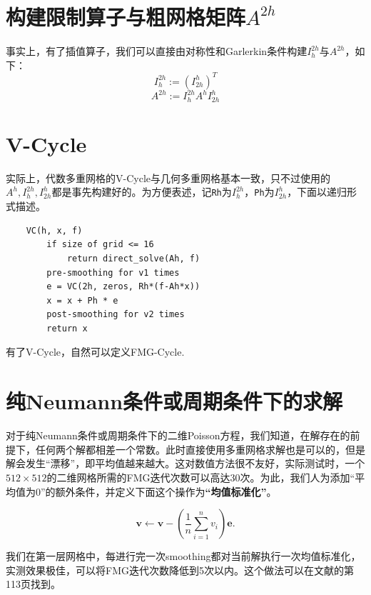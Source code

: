 \documentclass[lang=cn,10pt,bibend=bibtex]{elegantbook}
\begin{document}
\section{构建限制算子与粗网格矩阵$A^{2h}$}

事实上，有了插值算子，我们可以直接由对称性和Garlerkin条件构建$I_{h}^{2h}$与$A^{2h}$，如下：
\begin{equation}
  I_{h}^{2h}:=(I_{2h}^{h})^T
\end{equation}
\begin{equation}
  A^{2h}:=I_{h}^{2h}A^hI_{2h}^{h}
\end{equation}

\section{V-Cycle}

实际上，代数多重网格的V-Cycle与几何多重网格基本一致，只不过使用的$A^h,I_h^{2h},I_{2h}^h$都是事先构建好的。为方便表述，记\verb|Rh|为$I_{h}^{2h}$，\verb|Ph|为$I_{2h}^{h}$，下面以递归形式描述。

\begin{lstlisting}
    VC(h, x, f)
        if size of grid <= 16
            return direct_solve(Ah, f)
        pre-smoothing for v1 times
        e = VC(2h, zeros, Rh*(f-Ah*x))
        x = x + Ph * e
        post-smoothing for v2 times
        return x
\end{lstlisting}

有了V-Cycle，自然可以定义FMG-Cycle.

\section{纯Neumann条件或周期条件下的求解}

对于纯Neumann条件或周期条件下的二维Poisson方程，我们知道，在解存在的前提下，任何两个解都相差一个常数。此时直接使用多重网格求解也是可以的，但是解会发生“漂移”，即平均值越来越大。这对数值方法很不友好，实际测试时，一个$512\times 512$的二维网格所需的FMG迭代次数可以高达$30$次。为此，我们人为添加“平均值为$0$”的额外条件，并定义下面这个操作为\textbf{“均值标准化”}。

\begin{equation*}
  \mathbf{v}\gets \mathbf{v}-\left(\frac{1}{n}\sum_{i=1}^n v_i\right)\mathbf{e}.
\end{equation*}

我们在第一层网格中，每进行完一次smoothing都对当前解执行一次均值标准化，实测效果极佳，可以将FMG迭代次数降低到5次以内。这个做法可以在文献\cite{Multigrid}的第113页找到。
\end{document}
